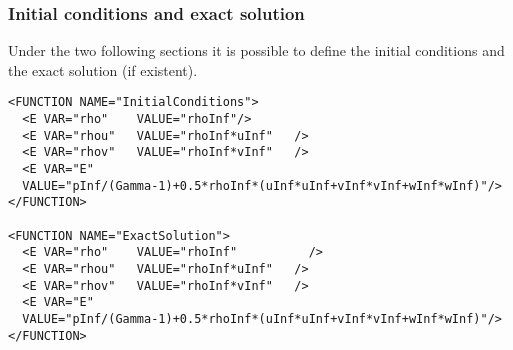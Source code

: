 \subsubsection*{Initial conditions and exact solution}
Under the two following sections it is possible to define the initial conditions and the exact solution (if existent).
\begin{lstlisting}[style=XmlStyle]           
<FUNCTION NAME="InitialConditions">
  <E VAR="rho"    VALUE="rhoInf"/>
  <E VAR="rhou"   VALUE="rhoInf*uInf"   />
  <E VAR="rhov"   VALUE="rhoInf*vInf"   />
  <E VAR="E"      
  VALUE="pInf/(Gamma-1)+0.5*rhoInf*(uInf*uInf+vInf*vInf+wInf*wInf)"/>
</FUNCTION>
                
<FUNCTION NAME="ExactSolution">
  <E VAR="rho"    VALUE="rhoInf"          />
  <E VAR="rhou"   VALUE="rhoInf*uInf"   />
  <E VAR="rhov"   VALUE="rhoInf*vInf"   />
  <E VAR="E"      
  VALUE="pInf/(Gamma-1)+0.5*rhoInf*(uInf*uInf+vInf*vInf+wInf*wInf)"/>
</FUNCTION>
\end{lstlisting}


